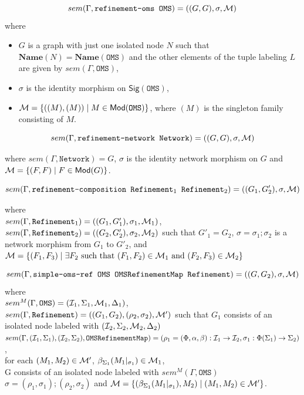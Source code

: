 \documentclass[10pt,fleqn,final]{scrreprt}
\newcommand*{\syntax}[1]{\texttt{#1}}
\newcommand{\Sig}{\mathsf{Sig}}
\newcommand{\Name}{\ensuremath{\mathbf{Name}}}
\newenvironment{definitions}[0]{\medskip }{}
\begin{document}
\begin{definitions}
$$sem(\Gamma, \syntax{refinement-oms OMS}) = 
   ((G, G), \sigma, \cM) $$
  \noindent where 
  \begin{itemize}
  \item $G$ is a graph with just one isolated node $N$
  such that $\Name(N) = \Name(\syntax{OMS})$
  and the other elements of the tuple labeling
  $L$ are given by $sem(\Gamma,\syntax{OMS})$,
  \item $\sigma$ is the identity morphism on 
  $\Sig(\syntax{OMS})$,  
  \item $\cM = \{((M), (M)) \mid M \in \Mod(\syntax{OMS})\}$,
   where $(M)$ is the singleton family consisting of $M$.
  \end{itemize}

$$sem(\Gamma, \syntax{refinement-network Network}) = ((G, G), \sigma, \cM)$$

\noindent 
where $sem(\Gamma, \syntax{Network}) = G$,
$\sigma$ is the identity network morphism on $G$
and 
${\cal M} = \{ (F, F) \mid F \in \mathsf{Mod}(G)\}$.

$$sem(\Gamma, \syntax{refinement-composition Refinement$_1$ Refinement$_2$}) = 
((G_1, G'_2), \sigma, \cM)$$

\noindent where\\ 
$sem(\Gamma, \syntax{Refinement}_1) = 
((G_1, G'_1), \sigma_1, \cM_1)$,
$sem(\Gamma, \syntax{Refinement}_2) = 
((G_2, G'_2), \sigma_2, \cM_2)$
such that $G'_1 = G_2$,
$\sigma = \sigma_1;\sigma_2$
is a network morphism from $G_1$ to $G'_2$, 
and
${\cal M} = \{(F_1, F_3) \mid \exists F_2 \text{ such that } 
(F_1, F_2) \in {\cal M}_1  \text{ and }
(F_2, F_3) \in {\cal M}_2  \}$

$$sem(\Gamma, \syntax{simple-oms-ref OMS OMSRefinementMap Refinement}) = 
((G, G_2), \sigma, \cM)$$
where\\
 $sem^M(\Gamma,  \syntax{OMS}) = (\cI_1,\Sigma_1, \cM_1, \Delta_1)$,\\
 $sem(\Gamma,  \syntax{Refinement}) = 
 ((G_1, G_2), (\rho_2,\sigma_2), \cM')$ 
 such that $G_1$ consists of an isolated node labeled with 
 $({\cal I}_2, \Sigma_2, {\cal M}_2, \Delta_2)$\\
 $sem(\Gamma,  (\cI_1,\Sigma_1), (\cI_2,\Sigma_2), \syntax{OMSRefinementMap}) = (\rho_1 = (\Phi, \alpha,\beta):\cI_1\to\cI_2, \sigma_1:\Phi(\Sigma_1)\to\Sigma_2)$,\\
 for each $(M_1, M_2) \in {\cal M}'$,
$\beta_{\Sigma_1}(M_1|_{\sigma_1}) \in {\cal M}_1$,\\
G consists of an isolated node labeled with $sem^M(\Gamma,  \syntax{OMS})$\\
$\sigma = (\rho_1,\sigma_1);(\rho_2,\sigma_2)$ and
${\cal M} = \{ (\beta_{\Sigma_1}(M_1|_{\sigma_1}), M_2) \mid
(M_1, M_2) \in {\cal M}' \}$.


\end{definitions}
\end{document}
